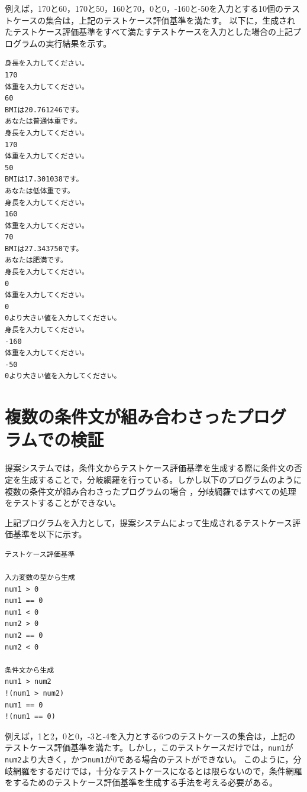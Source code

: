 \documentclass{tpu-sotu}
\begin{document}
例えば，170と60，170と50，160と70，0と0，-160と-50を入力とする10個のテストケースの集合は，上記のテストケース評価基準を満たす。
以下に，生成されたテストケース評価基準をすべて満たすテストケースを入力とした場合の上記プログラムの実行結果を示す。
\begin{lstlisting}[xleftmargin=1cm]
身長を入力してください。
170
体重を入力してください。
60
BMIは20.761246です。
あなたは普通体重です。
身長を入力してください。
170
体重を入力してください。
50
BMIは17.301038です。
あなたは低体重です。
身長を入力してください。
160
体重を入力してください。
70
BMIは27.343750です。
あなたは肥満です。
身長を入力してください。
0
体重を入力してください。
0
0より大きい値を入力してください。
身長を入力してください。
-160
体重を入力してください。
-50
0より大きい値を入力してください。
\end{lstlisting}
\section{複数の条件文が組み合わさったプログラムでの検証}
提案システムでは，条件文からテストケース評価基準を生成する際に条件文の否定を生成することで，分岐網羅を行っている。しかし以下のプログラムのように複数の条件文が組み合わさったプログラムの場合 ，分岐網羅ではすべての処理をテストすることができない。

上記プログラムを入力として，提案システムによって生成されるテストケース評価基準を以下に示す。
\begin{lstlisting}[xleftmargin=1cm]
テストケース評価基準

入力変数の型から生成
num1 > 0
num1 == 0
num1 < 0
num2 > 0
num2 == 0
num2 < 0

条件文から生成
num1 > num2
!(num1 > num2)
num1 == 0
!(num1 == 0)
\end{lstlisting}
例えば，1と2，0と0，-3と-4を入力とする6つのテストケースの集合は，上記のテストケース評価基準を満たす。しかし，このテストケースだけでは，{\tt num1}が{\tt num2}より大きく，かつ{\tt num1}が0である場合のテストができない。
このように，分岐網羅をするだけでは，十分なテストケースになるとは限らないので，条件網羅をするためのテストケース評価基準を生成する手法を考える必要がある。
\end{document}
